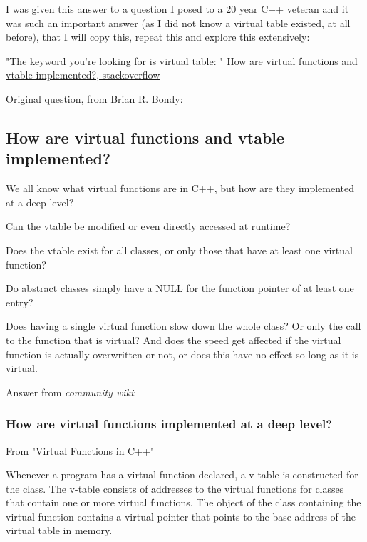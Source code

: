 \documentclass[10pt]{amsart}
\begin{document}
\begin{multicols*}{2}
I was given this answer to a question I posed to a 20 year C++ veteran and it was such an important answer (as I did not know a virtual table existed, at all before), that I will copy this, repeat this and explore this extensively:  

"The keyword you're looking for is virtual table: " \href{https://stackoverflow.com/questions/99297/how-are-virtual-functions-and-vtable-implemented}{How are virtual functions and vtable implemented?, stackoverflow}  

Original question, from \href{https://stackoverflow.com/users/3153/brian-r-bondy}{Brian R. Bondy}:  

\subsection{How are virtual functions and vtable implemented?}

We all know what virtual functions are in C++, but how are they implemented at a deep level?

Can the vtable be modified or even directly accessed at runtime?

Does the vtable exist for all classes, or only those that have at least one virtual function?

Do abstract classes simply have a NULL for the function pointer of at least one entry?

Does having a single virtual function slow down the whole class? Or only the call to the function that is virtual? And does the speed get affected if the virtual function is actually overwritten or not, or does this have no effect so long as it is virtual.

Answer from \emph{community wiki}:  

\subsubsection{How are virtual functions implemented at a deep level?}

From \href{http://wayback.archive.org/web/20100209040010/http://www.codersource.net/published/view/325/virtual_functions_in.aspx}{"Virtual Functions in C++"}

Whenever a program has a virtual function declared, a v-table is constructed for the class. The v-table consists of addresses to the virtual functions for classes that contain one or more virtual functions. The object of the class containing the virtual function contains a virtual pointer that points to the base address of the virtual table in memory.  


\end{multicols*}
\end{document}

